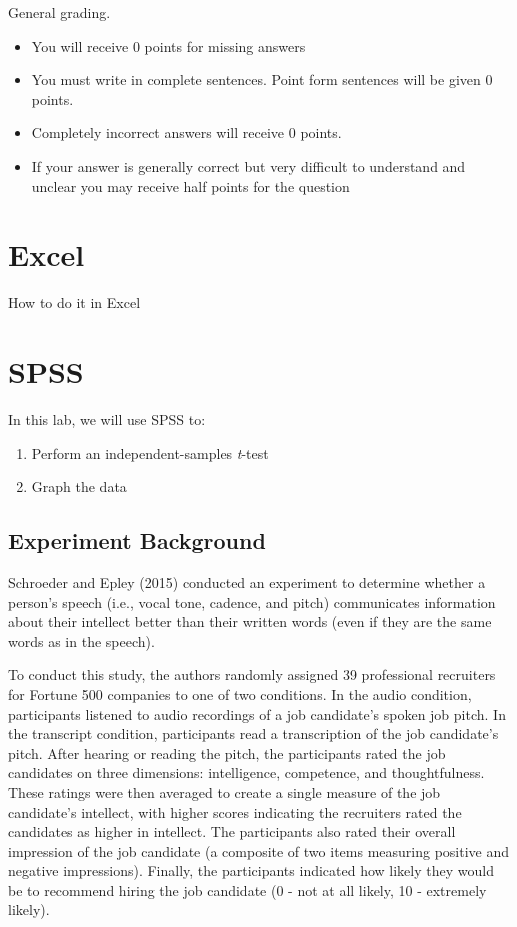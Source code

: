 \documentclass[
]{book}
\providecommand{\tightlist}{%
  \setlength{\itemsep}{0pt}\setlength{\parskip}{0pt}}
\begin{document}
General grading.

\begin{itemize}
\tightlist
\item
  You will receive 0 points for missing answers
\item
  You must write in complete sentences. Point form sentences will be given 0 points.
\item
  Completely incorrect answers will receive 0 points.
\item
  If your answer is generally correct but very difficult to understand and unclear you may receive half points for the question
\end{itemize}

\hypertarget{excel-5}{%
\section{Excel}\label{excel-5}}

How to do it in Excel

\hypertarget{spss-5}{%
\section{SPSS}\label{spss-5}}

In this lab, we will use SPSS to:

\begin{enumerate}
\def\labelenumi{\arabic{enumi}.}
\tightlist
\item
  Perform an independent-samples \emph{t}-test
\item
  Graph the data
\end{enumerate}

\hypertarget{experiment-background-1}{%
\subsection{Experiment Background}\label{experiment-background-1}}

Schroeder and Epley (2015) conducted an experiment to determine whether a person's speech (i.e., vocal tone, cadence, and pitch) communicates information about their intellect better than their written words (even if they are the same words as in the speech).

To conduct this study, the authors randomly assigned 39 professional recruiters for Fortune 500 companies to one of two conditions. In the audio condition, participants listened to audio recordings of a job candidate's spoken job pitch. In the transcript condition, participants read a transcription of the job candidate's pitch. After hearing or reading the pitch, the participants rated the job candidates on three dimensions: intelligence, competence, and thoughtfulness. These ratings were then averaged to create a single measure of the job candidate's intellect, with higher scores indicating the recruiters rated the candidates as higher in intellect. The participants also rated their overall impression of the job candidate (a composite of two items measuring positive and negative impressions). Finally, the participants indicated how likely they would be to recommend hiring the job candidate (0 - not at all likely, 10 - extremely likely).
\end{document}
